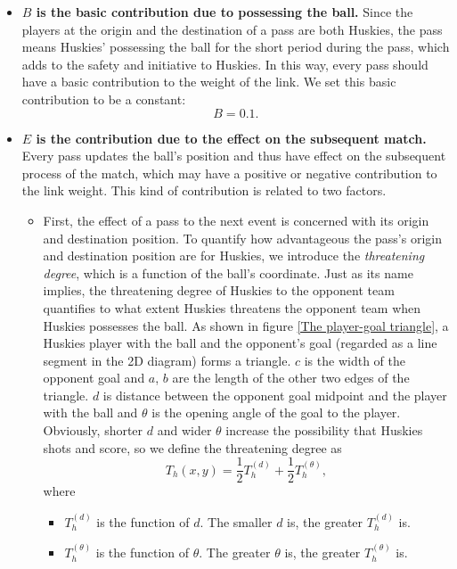 \documentclass[12pt]{article}
\begin{document}
\begin{itemize}
    \item \textbf{$B$ is the basic contribution due to possessing the ball.} Since the players at the origin and the destination of a pass are both Huskies, the pass means Huskies' possessing the ball for the short period during the pass, which adds to the safety and initiative to Huskies. In this way, every pass should have a basic contribution to the weight of the link. We set this basic contribution to be a constant:
    \begin{equation}
        B=0.1.
    \end{equation}
	\item \textbf{$E$ is the contribution due to the effect on the subsequent match.} Every pass updates the ball's position and thus have effect on the subsequent process of the match, which may have a positive or negative contribution to the link weight. This kind of contribution is related to two factors.
	\begin{itemize}
		\item First, the effect of a pass to the next event is concerned with its origin and destination position. To quantify how advantageous the pass's origin and destination position are for Huskies, we introduce the \textit{threatening degree}, which is a function of the ball's coordinate. Just as its name implies, the threatening degree of Huskies to the opponent team quantifies to what extent Huskies threatens the opponent team when Huskies possesses the ball. As shown in figure \ref{The player-goal triangle}, a Huskies player with the ball and the opponent's goal (regarded as a line segment in the 2D diagram) forms a triangle. $c$ is the width of the opponent goal and $a$, $b$ are the length of the other two edges of the triangle. $d$ is distance between the opponent goal midpoint and the player with the ball and $\theta$ is the opening angle of the goal to the player. Obviously, shorter $d$ and wider $\theta$ increase the possibility that Huskies shots and score, so we define the threatening degree as
		\begin{equation}
			T_h(x,y)=\frac{1}{2}T_h^{(d)}+\frac{1}{2}T_h^{(\theta)},
		\end{equation}
		where
		\begin{itemize}
			\item[] $T_h^{(d)}$ is the function of $d$. The smaller $d$ is, the greater $T_h^{(d)}$ is.
			\item[] $T_h^{(\theta)}$ is the function of $\theta$. The greater $\theta$ is, the greater $T_h^{(\theta)}$ is.

\end{itemize}
\end{itemize}
\end{itemize}
\end{document}
